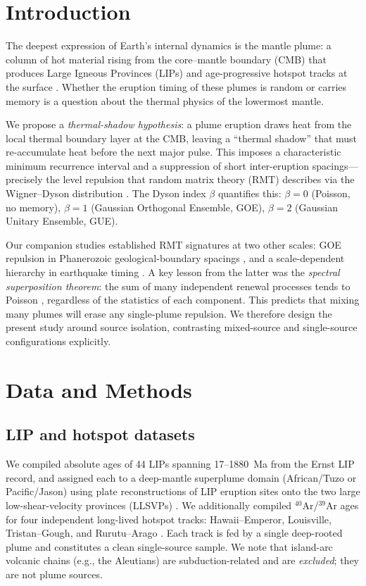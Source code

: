 \documentclass[12pt,a4paper]{article}
\begin{document}
\section{Introduction}

The deepest expression of Earth's internal dynamics is the mantle plume: a column of hot material rising from the core--mantle boundary (CMB) that produces Large Igneous Provinces (LIPs) and age-progressive hotspot tracks at the surface \citep{morgan1971,ernst2014}. Whether the eruption timing of these plumes is random or carries memory is a question about the thermal physics of the lowermost mantle.

We propose a \emph{thermal-shadow hypothesis}: a plume eruption draws heat from the local thermal boundary layer at the CMB, leaving a ``thermal shadow'' that must re-accumulate heat before the next major pulse. This imposes a characteristic minimum recurrence interval and a suppression of short inter-eruption spacings---precisely the level repulsion that random matrix theory (RMT) describes via the Wigner--Dyson distribution \citep{wigner1957,mehta2004}. The Dyson index $\beta$ quantifies this: $\beta=0$ (Poisson, no memory), $\beta=1$ (Gaussian Orthogonal Ensemble, GOE), $\beta=2$ (Gaussian Unitary Ensemble, GUE).

Our companion studies established RMT signatures at two other scales: GOE repulsion in Phanerozoic geological-boundary spacings \citep{chen2026geo}, and a scale-dependent hierarchy in earthquake timing \citep{chen2026fault}. A key lesson from the latter was the \emph{spectral superposition theorem}: the sum of many independent renewal processes tends to Poisson \citep{daley2003}, regardless of the statistics of each component. This predicts that mixing many plumes will erase any single-plume repulsion. We therefore design the present study around source isolation, contrasting mixed-source and single-source configurations explicitly.

\section{Data and Methods}

\subsection{LIP and hotspot datasets}
We compiled absolute ages of 44 LIPs spanning 17--1880~Ma from the Ernst \citep{ernst2014} LIP record, and assigned each to a deep-mantle superplume domain (African/Tuzo or Pacific/Jason) using plate reconstructions of LIP eruption sites onto the two large low-shear-velocity provinces (LLSVPs) \citep{torsvik2010}. We additionally compiled $^{40}$Ar/$^{39}$Ar ages for four independent long-lived hotspot tracks: Hawaii--Emperor, Louisville, Tristan--Gough, and Rurutu--Arago \citep{konrad2018,oconnor2013}. Each track is fed by a single deep-rooted plume and constitutes a clean single-source sample. We note that island-arc volcanic chains (e.g., the Aleutians) are subduction-related and are \emph{excluded}; they are not plume sources.
\end{document}
